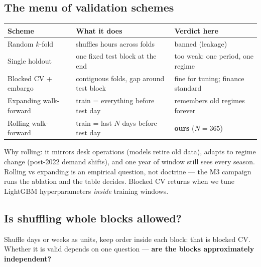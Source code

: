 \subsection{The menu of validation schemes}

\begin{center}
\begin{tabular}{lp{6.5cm}l}
\toprule
Scheme & What it does & Verdict here \\
\midrule
Random $k$-fold & shuffles hours across folds & banned (leakage) \\
Single holdout & one fixed test block at the end & too weak: one period, one regime \\
Blocked CV + embargo & contiguous folds, gap around test block & fine for tuning; finance standard \\
Expanding walk-forward & train = everything before test day & remembers old regimes forever \\
Rolling walk-forward & train = last $N$ days before test day & \textbf{ours} ($N=365$) \\
\bottomrule
\end{tabular}
\end{center}

Why rolling: it mirrors desk operations (models retire old data), adapts to
regime change (post-2022 demand shifts), and one year of window still sees
every season. Rolling vs expanding is an empirical question, not doctrine ---
the M3 campaign runs the ablation and the table decides. Blocked CV
returns when we tune LightGBM hyperparameters \emph{inside} training windows.

\subsection{Is shuffling whole blocks allowed?}

Shuffle days or weeks as units, keep order inside each block: that is
blocked CV. Whether it is valid depends on one question ---
\textbf{are the blocks approximately independent?}

